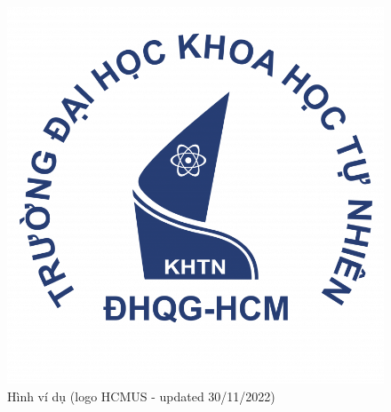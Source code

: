 \begin{figure}[H]
\centering
\includegraphics[scale=.4]{img/hcmus-logo.png}
\caption{Hình ví dụ (logo HCMUS - updated 30/11/2022)}
\label{fig:my_label_with_H}
\end{figure}